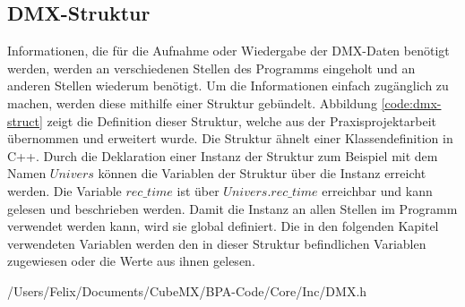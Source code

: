 
\subsection{DMX-Struktur}
\label{sec:dmx_struct}
Informationen, die für die Aufnahme oder Wiedergabe der DMX-Daten benötigt werden, werden an verschiedenen Stellen des Programms eingeholt und an anderen Stellen wiederum benötigt. Um die Informationen einfach zugänglich zu machen, werden diese mithilfe einer Struktur gebündelt. Abbildung \ref{code:dmx-struct} zeigt die Definition dieser Struktur, welche aus der Praxisprojektarbeit übernommen und erweitert wurde. Die Struktur ähnelt einer Klassendefinition in C++. Durch die Deklaration einer Instanz der Struktur zum Beispiel mit dem Namen $Univers$ können die Variablen der Struktur über die Instanz erreicht werden. Die Variable $rec\_time$ ist über $Univers.rec\_time$ erreichbar und kann gelesen und beschrieben werden. Damit die Instanz an allen Stellen im Programm verwendet werden kann, wird sie global definiert. Die in den folgenden Kapitel verwendeten Variablen werden den in dieser Struktur befindlichen Variablen zugewiesen oder die Werte aus ihnen gelesen.

{/Users/Felix/Documents/CubeMX/BPA-Code/Core/Inc/DMX.h}